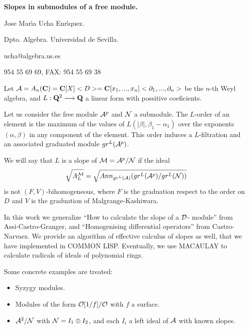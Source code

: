 \documentclass{article}
\begin{document}
\begin{center}
{\bf Slopes in submodules of a free module.}
\end{center}

\begin{center}
Jose Mar\'{\i}a Ucha Enr\'{\i}quez.

Dpto. Algebra. Universidad de Sevilla.

ucha@algebra.us.es

954 55 69 69, FAX: 954 55 69 38
\end{center}


\noindent
Let ${\cal A} = A_n ({\bf C}) = {\bf C}[X]<D>= {\bf C}[x_1, ..., x_n]
<\partial_1, ..., \partial_n>$ 
be the $n$-th Weyl algebra, and $L: {\bf Q}^2 \longrightarrow 
{\bf Q}$ a linear form with possitive coeficients.
  
Let us consider the free module ${\cal A}^p$ and ${\cal N}$ a submodule.
The $L$-order of an element is the maximum of the values of 
$L(|\beta|,\beta_1 - \alpha_1)$ over the exponents $(\alpha, \beta)$ in any 
component of the element.  This order induces a $L$-filtration and an 
associated graduated module $gr^L ({\cal A}^p)$.
    
We will say that $L$ is a slope of ${\cal M} = {\cal A}^p/{\cal N}$
if the ideal
$$
\sqrt{A^{\cal M}_L} = \sqrt{Ann_{gr^L ({\cal A})} (gr^L ({\cal A}^p)
/gr^L({\cal N}))}
$$
is not $(F,V)$-bihomogeneous, where $F$ 
is the graduation respect to the order on $D$
and $V$ is the graduation of Malgrange-Kashiwara.

In this work we generalize ``How to calculate the slope of a ${\cal D}$-
module'' from Assi-Castro-Granger, and  
``Homogenising differential operators'' from Castro-Narvaez. 
We provide an algorithm of effective calculus of 
slopes as well, that we have implemented in COMMON LISP. 
Eventually, we use MACAULAY to calculate radicals of ideals of 
polynomial rings. 



Some concrete examples are treated:
\begin{itemize} 
\item Syzygy modules. 
\item Modules of the form 
${\cal O}[1/f]/{\cal O}$ with $f$ a surface.
\item ${\cal A}^2 /{\cal N}$ with ${\cal N} 
= I_1 \oplus I_2$, and each $I_i$ a left ideal of ${\cal A}$ with known 
slopes.
\end{itemize} 
   
\end{document}
